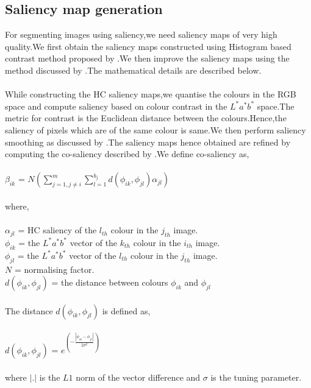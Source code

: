 \documentclass{article}
\begin{document}
\subsection{Saliency map generation}
For segmenting images using saliency,we need saliency maps of very high quality.We first obtain the saliency maps constructed using Histogram based contrast method proposed by \cite{11cvpr/Cheng_Saliency}.We then improve the saliency maps using the method discussed by \cite{6194335}.The mathematical details are described below.\\\\
While constructing the HC saliency maps,we quantise the colours in the RGB space and compute saliency based on colour contrast in the $L^{*}a^{*}b^{*}$ space.The metric for contrast is the Euclidean distance between the colours.Hence,the saliency of pixels which are of the same colour is same.We then perform saliency smoothing as discussed by \cite{11cvpr/Cheng_Saliency}.The saliency maps hence obtained are refined by computing the co-saliency described by \cite{6194335}.We define co-saliency as,\\\\
\hspace*{3 cm}
$\beta_{ik}$ = $N(\sum_{j=1,j \neq i}^{m}\sum_{l=1}^{b_j}d(\phi_{ik},\phi_{jl})\alpha_{jl})$\\\\
\normalsize
where,\\\\
$\alpha_{jl}$ = HC saliency of the $l_{th}$ colour in the $j_{th}$ image.\\
$\phi_{ik}$ = the $L^{*}a^{*}b^{*}$ vector of the $k_{th}$ colour in the $i_{th}$ image.\\
$\phi_{jl}$ = the $L^{*}a^{*}b^{*}$ vector of the $l_{th}$ colour in the $j_{th}$ image.\\
$N$ = normalising factor.\\
$d(\phi_{ik},\phi_{jl})$ = the distance between colours $\phi_{ik}$ and $\phi_{jl}$\\\\
The distance $d(\phi_{ik},\phi_{jl})$ is defined as,\\\\
\hspace*{3 cm}
$d(\phi_{ik},\phi_{jl})$ = $e^{(-\frac{|\phi_{ik}-\phi_{jl}|}{2\sigma^{2}})}$\\\\
\normalsize
where $|.|$ is the $L1$ norm of the vector difference and $\sigma$ is the tuning parameter.\\\\
\end{document}
